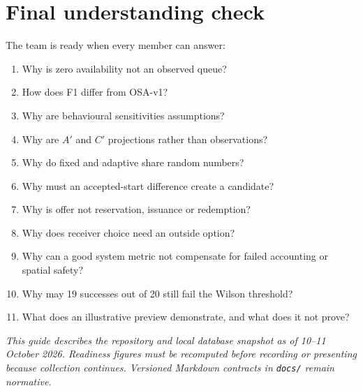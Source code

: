 \documentclass[11pt,a4paper]{article}
\newcommand{\code}[1]{\texttt{#1}}
\begin{document}
\section{Final understanding check}

The team is ready when every member can answer:
\begin{enumerate}
\item Why is zero availability not an observed queue?
\item How does F1 differ from OSA-v1?
\item Why are behavioural sensitivities assumptions?
\item Why are $A'$ and $C'$ projections rather than observations?
\item Why do fixed and adaptive share random numbers?
\item Why must an accepted-start difference create a candidate?
\item Why is offer not reservation, issuance or redemption?
\item Why does receiver choice need an outside option?
\item Why can a good system metric not compensate for failed accounting or spatial safety?
\item Why may 19 successes out of 20 still fail the Wilson threshold?
\item What does an illustrative preview demonstrate, and what does it not prove?
\end{enumerate}

\vfill
\small\textit{This guide describes the repository and local database snapshot as of 10--11 October 2026. Readiness figures must be recomputed before recording or presenting because collection continues. Versioned Markdown contracts in \code{docs/} remain normative.}
\end{document}
